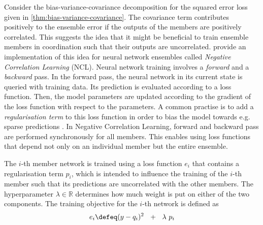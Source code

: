 \documentclass[../main.tex]{subfiles}
\begin{document}

Consider the bias-variance-covariance decomposition for the squared error loss given in \cref{thm:bias-variance-covariance}.
The covariance term contributes positively to the ensemble error if the outputs of the members are positively  correlated. This suggests the idea that it might be beneficial to train ensemble members in coordination such that their outputs are uncorrelated.
\citeauthor{liu_EnsembleLearningNegative_1999} \cite{liu_EnsembleLearningNegative_1999} provide an implementation of this idea for neural network ensembles called \textit{Negative Correlation Learning} (NCL).
Neural network training involves a \textit{forward} and a \textit{backward} pass. In the forward pass, the neural network in its current state is queried with training data. Its prediction is evaluated according to a loss function. 
Then, the model parameters are updated according to the gradient of the loss function with respect to the parameters. 
%
A common practise is to add a \textit{regularisation term} to this loss function in order to bias the model towards e.g. sparse predictions \cite{tibshirani_ElementsStatisticalLearning_2017}. 
%
In Negative Correlation Learning, forward and backward pass are performed synchronously for all members. This enables using loss functions that depend not only on an individual member but the entire ensemble.

The $i$-th member network is trained using a loss function $e_{i}$ that contains a regularisation term $p_{i}$, which is intended to influence the training of the $i$-th member such that its predictions are uncorrelated with the other members. The hyperparameter $\lambda \in \mathbb{R}$ determines how much weight is put on either of the two components. The training objective for the $i$-th network is defined as
$$
 e_i \defeq ( y - q_{i})^2 ~ ~ + ~ ~ \lambda ~ p_{i}
$$
\end{document}
